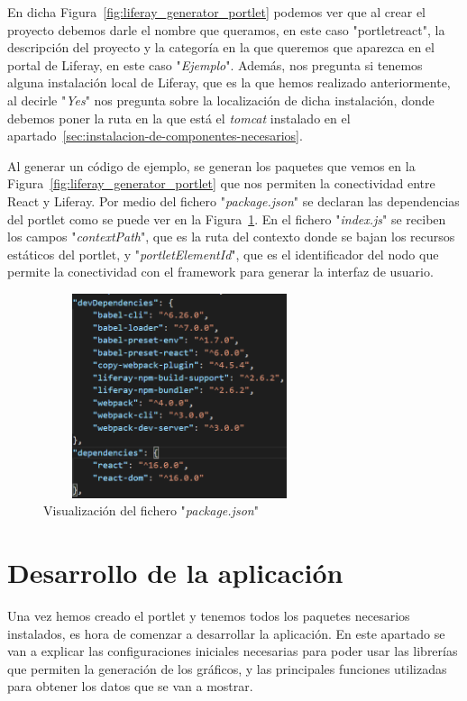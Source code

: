 \documentclass[a4paper, 12pt]{book}
\begin{document}
En dicha Figura~\ref{fig:liferay_generator_portlet} podemos ver que al crear el proyecto debemos darle el nombre que queramos, en este caso "portletreact", la descripción del proyecto y la categoría en la que queremos que aparezca en el portal de Liferay, en este caso "\textit{Ejemplo}". 
Además, nos pregunta si tenemos alguna instalación local de Liferay, que es la que hemos realizado anteriormente, al decirle "\textit{Yes}" nos pregunta sobre la localización de dicha instalación, donde debemos poner la ruta en la que está el \textit{tomcat} instalado en el apartado~\ref{sec:instalacion-de-componentes-necesarios}.

Al generar un código de ejemplo, se generan los paquetes que vemos en la Figura~\ref{fig:liferay_generator_portlet} que nos permiten la conectividad entre React y Liferay. Por medio del fichero "\textit{package.json}" se declaran las dependencias del portlet como se puede ver en la Figura~\ref{fig:package_ini}. En el fichero "\textit{index.js}" se reciben los campos "\textit{contextPath}", que es la ruta del contexto donde se bajan los recursos estáticos del portlet, y "\textit{portletElementId}", que es el identificador del nodo que permite la conectividad con el framework para generar la interfaz de usuario.
\begin{figure}[h]
  \centering
  \includegraphics[width=8cm, height=6cm]{img_usadas/package_ini.png}
  \caption{Visualización del fichero "\textit{package.json}"}
  \label{fig:package_ini}
\end{figure}


\vspace{5mm}
\section{Desarrollo de la aplicación} 
\label{sec:desarrollo-aplicacion}
Una vez hemos creado el portlet y tenemos todos los paquetes necesarios instalados, es hora de comenzar a desarrollar la aplicación. En este apartado se van a explicar las configuraciones iniciales necesarias para poder usar las librerías que permiten la generación de los gráficos, y las principales funciones utilizadas para obtener los datos que se van a mostrar.
\end{document}
